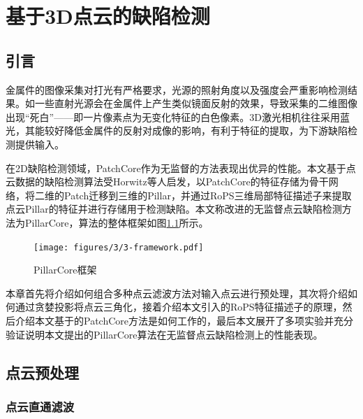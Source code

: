 \chapter{基于3D点云的缺陷检测}


\section{引言}
金属件的图像采集对打光有严格要求，光源的照射角度以及强度会严重影响检测结果。如一些直射光源会在金属件上产生类似镜面反射的效果，导致采集的二维图像出现“死白”——即一片像素点为无变化特征的白色像素。3D激光相机往往采用蓝光，其能较好降低金属件的反射对成像的影响，有利于特征的提取，为下游缺陷检测提供输入。

在2D缺陷检测领域，PatchCore作为无监督的方法表现出优异的性能。本文基于点云数据的缺陷检测算法受Horwitz等人\cite{horwitzBackFeatureClassical2022}启发，以PatchCore的特征存储为骨干网络，将二维的Patch迁移到三维的Pillar\cite{langPointPillarsFastEncoders2019a}，并通过RoPS三维局部特征描述子来提取点云Pillar的特征并进行存储用于检测缺陷。本文称改进的无监督点云缺陷检测方法为PillarCore，算法的整体框架如图\ref{fig:PillarCore}所示。
\begin{figure}[htbp]
    \centering
    \texttt{[image: figures/3/3-framework.pdf]}
    \caption{PillarCore框架}\label{fig:PillarCore}
\end{figure}

本章首先将介绍如何组合多种点云滤波方法对输入点云进行预处理，其次将介绍如何通过贪婪投影将点云三角化，接着介绍本文引入的RoPS特征描述子的原理，然后介绍本文基于的PatchCore方法是如何工作的，最后本文展开了多项实验并充分验证说明本文提出的PillarCore算法在无监督点云缺陷检测上的性能表现。



\section{点云预处理}
\subsection{点云直通滤波}


